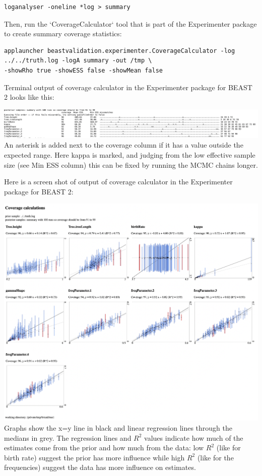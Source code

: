 \documentclass[oneside]{article}
\begin{document}
{\scriptsize
\begin{lstlisting}
loganalyser -oneline *log > summary
\end{lstlisting}
}

Then, run the `CoverageCalculator` tool that is part of the Experimenter package to create summary coverage statistics:

{\scriptsize
\begin{lstlisting}
applauncher beastvalidation.experimenter.CoverageCalculator -log ../../truth.log -logA summary -out /tmp \
-showRho true -showESS false -showMean false 
\end{lstlisting}
}

   {Terminal output of coverage calculator in the Experimenter package for BEAST 2 looks like this:
   
   \includegraphics[width=\textwidth]{../figures/coveragecalculator0.png}
   An asterisk is added next to the coverage column if it has a value outside the expected range.
   Here kappa is marked, and judging from the low effective sample size (see Min ESS column) this can be fixed by running the MCMC chains longer.}
Here is a screen shot of output of coverage calculator in the Experimenter package for BEAST 2:

   \includegraphics[width=\textwidth]{../figures/coveragecalculator.png}
   {
   Graphs show the x=y line in black and linear regression lines through the medians in grey.
   The regression lines and $R^2$ values indicate how much of the estimates come from the prior and how much from the data:
   low $R^2$ (like for birth rate) suggest the prior has more influence while high $R^2$ (like for the frequencies) suggest the data has more influence on estimates.
   }
\end{document}
